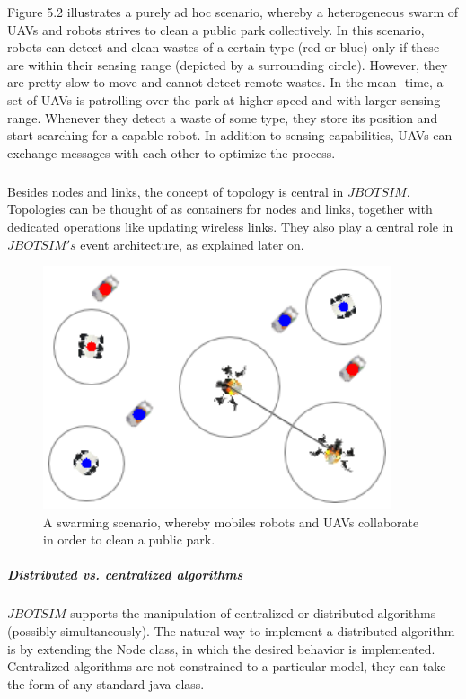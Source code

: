 Figure 5.2 illustrates a purely ad hoc scenario, whereby a heterogeneous swarm of UAVs and robots strives to clean a public park collectively. In this scenario, robots can detect and clean wastes of a certain type (red or blue) only if these are within their sensing range (depicted by a surrounding circle). However, they are pretty slow to move and cannot detect remote wastes. In the mean- time, a set of UAVs is patrolling over the park at higher speed and with larger sensing range. Whenever they detect a waste of some type, they store its position and start searching for a capable robot. In addition to sensing capabilities, UAVs can exchange messages with each other to optimize the process.
\subparagraph{}Besides nodes and links, the concept of topology is central in  $JBOTSIM$. Topologies can be thought of as containers for nodes and links, together with dedicated operations like updating wireless links. They also play a central role in  $JBOTSIM's$ event architecture, as explained later on.
\begin{figure}[h!]
	\centering
	\includegraphics[width=0.5\linewidth]{fig_3}
	\caption[A swarming scenario, whereby mobiles robots and UAVs collaborate in order to clean a public park.]{A swarming scenario, whereby mobiles robots and UAVs collaborate in order to clean a public park.}
	\label{fig:fig3}
\end{figure}
\newpage
\subparagraph{Distributed vs. centralized algorithms}
\subparagraph{} $JBOTSIM$  supports the manipulation of centralized or distributed algorithms (possibly simultaneously). The natural way to implement a distributed algorithm is by extending the Node class, in which the desired behavior is implemented. Centralized algorithms are not constrained to a particular model, they can take the form of any standard java class.
